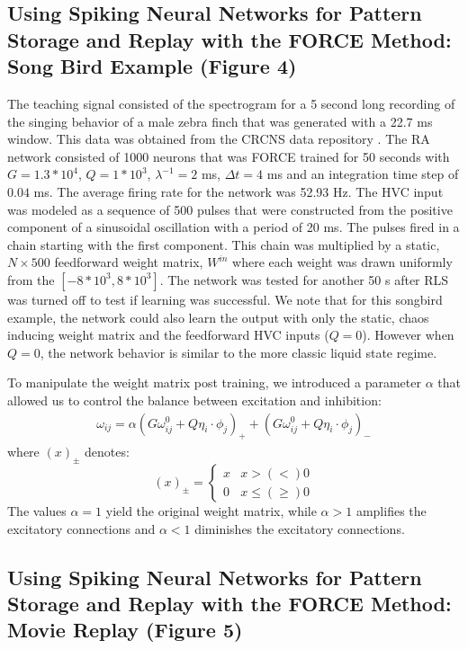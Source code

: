 \documentclass[11pt]{article} %
\begin{document}
\subsection*{Using Spiking Neural Networks for Pattern Storage and Replay with the FORCE Method: Song Bird Example (Figure 4)}

The teaching signal consisted of the spectrogram for a 5 second long recording of the singing behavior of a male zebra finch that was generated with a 22.7 ms window.  This data was obtained from the CRCNS data repository \cite{songbirddata}.  The RA network consisted of 1000 neurons that was FORCE trained for 50 seconds with $G=1.3*10^4$, $Q = 1*10^3$, $\lambda^{-1} =  2$ ms, $\Delta t = 4$ ms and an integration time step of $0.04$ ms.   The average firing rate for the network was 52.93 Hz.   The HVC input was modeled as a sequence of 500 pulses that were constructed from the positive component of a sinusoidal oscillation with a period of 20 ms.  The pulses fired in a chain starting with the first component.  This chain was multiplied by a static, $N\times 500$ feedforward weight matrix, $W^{in}$ where each weight was drawn uniformly from the $[-8*10^3,8*10^3]$.  The network was tested for another 50 s after RLS was turned off to test if learning was successful.  We note that for this songbird example, the network could also learn the output with only the static, chaos inducing weight matrix and the feedforward HVC inputs ($Q=0$).  However when $Q=0$, the network behavior is similar to the more classic liquid state regime.   

To manipulate the weight matrix post training, we introduced a parameter $\alpha$ that allowed us to control the balance between excitation and inhibition: 
\begin{eqnarray}
\omega_{ij} = \alpha \left(G\omega_{ij}^0 + Q\eta_i\cdot \phi_j \right)_+   +  \left(G\omega_{ij}^0 + Q\eta_i\cdot \phi_j\right)_-   
\end{eqnarray}
where $(x)_\pm$ denotes:
$$ (x)_\pm = \begin{cases} x & x >(<) 0  \\ 0  & x\leq (\geq) 0  \end{cases}$$ 
The values $\alpha = 1$ yield the original weight matrix, while $\alpha > 1$ amplifies the excitatory connections and $\alpha < 1$ diminishes the excitatory connections.  






\subsection*{Using Spiking Neural Networks for Pattern Storage and Replay with the FORCE Method: Movie Replay (Figure 5)}
\end{document}
